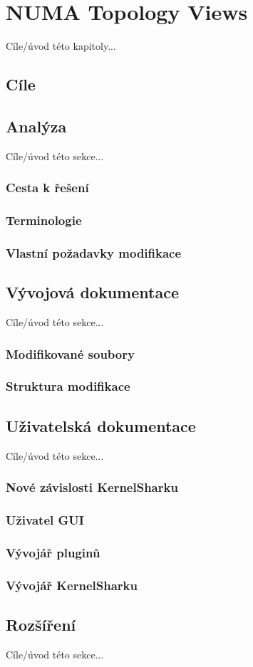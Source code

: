 \chapter{NUMA Topology Views}
Cíle/úvod této kapitoly...

\section{Cíle}


\section{Analýza}
Cíle/úvod této sekce...

\subsection{Cesta k řešení}

\subsection{Terminologie}

\subsection{Vlastní požadavky modifikace}


\section{Vývojová dokumentace}
Cíle/úvod této sekce...

\subsection{Modifikované soubory}

\subsection{Struktura modifikace}

\section{Uživatelská dokumentace}
Cíle/úvod této sekce...

\subsection{Nové závislosti KernelSharku}

\subsection{Uživatel GUI}

\subsection{Vývojář pluginů}

\subsection{Vývojář KernelSharku}

\section{Rozšíření}
Cíle/úvod této sekce...
